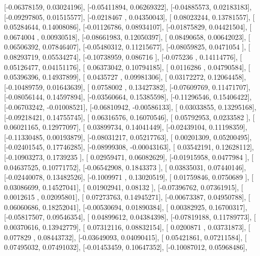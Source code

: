 \documentclass{article}
\begin{document}
       [-0.06378159,  0.03024196],
       [-0.05411894,  0.06269322],
       [-0.04885573,  0.02183183],
       [-0.09297805,  0.01515577],
       [-0.0218467 ,  0.04350043],
       [ 0.08023244,  0.13781557],
       [ 0.05284644,  0.14008086],
       [-0.01126786,  0.08934107],
       [-0.01875829,  0.04421504],
       [ 0.0674004 ,  0.00930518],
       [-0.08661983,  0.12050397],
       [ 0.08490658,  0.00642023],
       [ 0.06506392,  0.07846407],
       [-0.05480312,  0.11215677],
       [-0.08059825,  0.0471054 ],
       [ 0.08293719,  0.05534274],
       [-0.10738959,  0.086716  ],
       [-0.075236  ,  0.14114776],
       [ 0.05126477,  0.04151176],
       [ 0.06373042,  0.10794185],
       [ 0.0116286 ,  0.04790584],
       [ 0.05396396,  0.14937899],
       [ 0.0435727 ,  0.09981306],
       [ 0.03172272,  0.12064458],
       [-0.10489759,  0.01643639],
       [ 0.0758002 ,  0.13427382],
       [-0.07609769,  0.11471707],
       [-0.08056144,  0.14597894],
       [-0.03560664,  0.15385598],
       [-0.11296546,  0.15406422],
       [-0.06703242, -0.01008521],
       [-0.06810942, -0.00586133],
       [ 0.03033855,  0.13295168],
       [-0.09218421,  0.14755745],
       [ 0.06316576,  0.16070546],
       [ 0.05792953,  0.0233582 ],
       [ 0.06021165,  0.12977097],
       [ 0.03899734,  0.14041449],
       [-0.02439104,  0.11198359],
       [-0.11330485,  0.00193879],
       [-0.08031217,  0.05217763],
       [ 0.00201309,  0.05200495],
       [-0.02401545,  0.17746285],
       [-0.08999308, -0.00043163],
       [ 0.03542191,  0.12628112],
       [-0.10903273,  0.1739235 ],
       [ 0.02959471,  0.06082629],
       [-0.01915958,  0.0477984 ],
       [ 0.04637525,  0.10771752],
       [-0.06542908,  0.1843373 ],
       [ 0.03835031,  0.07440146],
       [-0.02440078,  0.13482526],
       [-0.1009971 ,  0.13020519],
       [ 0.01759846,  0.0750689 ],
       [ 0.03086699,  0.14527041],
       [ 0.01902941,  0.08132   ],
       [-0.07396762,  0.07361915],
       [ 0.0012615 ,  0.02095801],
       [ 0.07273763,  0.14945271],
       [-0.00673387,  0.04950788],
       [ 0.06060686,  0.18252041],
       [-0.00530694,  0.01890384],
       [ 0.00382925,  0.16700317],
       [-0.05817507,  0.09546354],
       [ 0.04899612,  0.04384398],
       [-0.07819188,  0.11789773],
       [ 0.00370616,  0.13942779],
       [ 0.07312116,  0.08832154],
       [ 0.0200871 ,  0.03731873],
       [ 0.077829  ,  0.08443732],
       [-0.03649093,  0.04090415],
       [ 0.05421861,  0.07211584],
       [ 0.07495032,  0.07491032],
       [-0.01453459,  0.10647352],
       [-0.10087012,  0.05968486],
\end{document}
